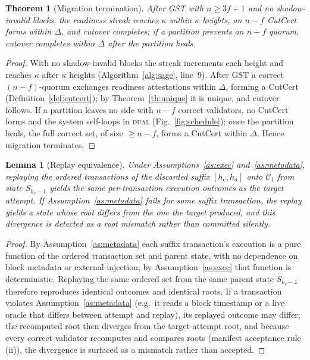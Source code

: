 \documentclass[journal]{IEEEtran}
\newtheorem{theorem}{Theorem}
\newtheorem{lemma}{Lemma}
\theoremstyle{remark}
\begin{document}
\begin{theorem}[Migration termination]
\label{th:termination}
After GST with $n\ge 3f+1$ and no shadow-invalid blocks, the readiness streak reaches $\kappa$
within $\kappa$ heights, an $n-f$ CutCert forms within $\Delta$, and cutover completes; if a
partition prevents an $n-f$ quorum, cutover completes within $\Delta$ after the partition
heals.
\end{theorem}
\begin{proof}
With no shadow-invalid blocks the streak increments each height and reaches $\kappa$ after
$\kappa$ heights (Algorithm~\ref{alg:sage}, line~9). After GST a correct $(n-f)$-quorum exchanges
readiness attestations within $\Delta$, forming a CutCert (Definition~\ref{def:cutcert}); by
Theorem~\ref{th:unique} it is unique, and cutover follows. If a partition leaves no side with
$n-f$ correct validators, no CutCert forms and the system self-loops in \textsc{dual}
(Fig.~\ref{fig:schedule}); once the partition heals, the full correct set, of size $\ge n-f$,
forms a CutCert within $\Delta$. Hence migration terminates.
\end{proof}

\begin{lemma}[Replay equivalence]
\label{lem:replay}
Under Assumptions~\ref{as:exec} and~\ref{as:metadata}, replaying the ordered transactions of the
discarded suffix $[h_{\mathrm{c}}, h_a]$ onto $\mathcal{C}_1$ from state $S_{h_{\mathrm{c}}-1}$
yields the same per-transaction execution outcomes as the target attempt. If
Assumption~\ref{as:metadata} fails for some suffix transaction, the replay yields a state whose root
differs from the one the target produced, and this divergence is detected as a root mismatch rather
than committed silently.
\end{lemma}
\begin{proof}
By Assumption~\ref{as:metadata} each suffix transaction's execution is a pure function of the
ordered transaction set and parent state, with no dependence on block metadata or external
injection; by Assumption~\ref{as:exec} that function is deterministic. Replaying the same ordered
set from the same parent state $S_{h_{\mathrm{c}}-1}$ therefore reproduces identical outcomes and
identical roots. If a transaction violates Assumption~\ref{as:metadata} (e.g.\ it reads a block
timestamp or a live oracle that differs between attempt and replay), its replayed outcome may
differ; the recomputed root then diverges from the target-attempt root, and because every correct
validator recomputes and compares roots (manifest acceptance rule (ii)), the divergence is surfaced
as a mismatch rather than accepted.
\end{proof}
\end{document}
